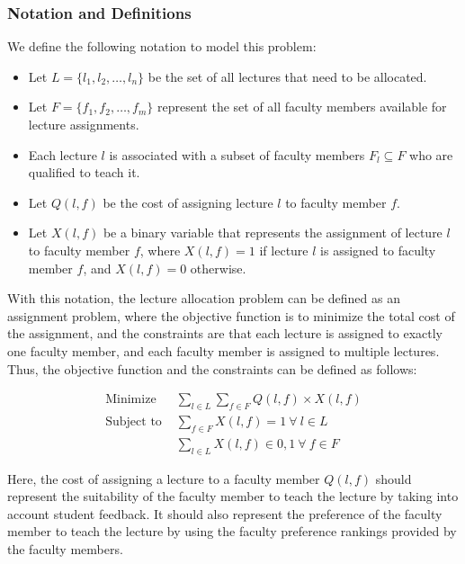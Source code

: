 \subsubsection{Notation and Definitions}
We define the following notation to model this problem:
\begin{itemize}
  \item Let \( L = \{l_1, l_2, \ldots, l_n\} \) be the set of all lectures that need to be allocated.
  \item Let \( F = \{f_1, f_2, \ldots, f_m\} \) represent the set of all faculty members available for lecture assignments.
  \item Each lecture \( l \) is associated with a subset of faculty members \( F_l \subseteq F \) who are qualified to teach it.
  \item Let \( Q(l, f) \) be the cost of assigning lecture \( l \) to faculty member \( f \).
  \item Let \( X(l, f) \) be a binary variable that represents the assignment of lecture \( l \) to faculty member \( f \), where \( X(l, f) = 1 \) if lecture \( l \) is assigned to faculty member \( f \), and \( X(l, f) = 0 \) otherwise.
\end{itemize}

With this notation, the lecture allocation problem can be defined as an assignment problem, where the objective function is to minimize the total cost of the assignment, and the constraints are that each lecture is assigned to exactly one faculty member, and each faculty member is assigned to multiple lectures. Thus, the objective function and the constraints can be defined as follows:

\begin{equation}
  \begin{aligned}
    \text{Minimize }   & \sum_{l \in L} \sum_{f \in F} Q(l, f) \times X(l, f)  \\
    \text{Subject to } & \sum_{f \in F} X(l, f) = 1 \ \forall\  l \in L        \\
                       & \sum_{l \in L} X(l, f) \in {0, 1} \ \forall\  f \in F
  \end{aligned}
\end{equation}

Here, the cost of assigning a lecture to a faculty member \( Q(l, f) \) should represent the suitability of the faculty member to teach the lecture by taking into account student feedback. It should also represent the preference of the faculty member to teach the lecture by using the faculty preference rankings provided by the faculty members.

